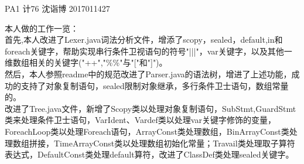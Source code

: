 \documentclass[UTF8]{ctexart}
\begin{document}
\begin{center}
PA1
计76 沈诣博 2017011427
\end{center}
本人做的工作一览：\\
首先,本人改进了Lexer.java词法分析文件，增添了scopy，sealed，default,in和foreach关键字，帮助实现串行条件卫视语句的符号"|||"，var关键字，以及其他一维数组相关的关键字("++","\%\%"与"["和"]")。\\
然后，本人参照readme中的规范改进了Parser.java的语法树，增进了上述功能，成功的支持了对象复制语句，sealed限制对象继承，多行条件卫士语句，数组常量的。\\
改进了Tree.java文件，新增了Scopy类以处理对象复制语句，SubStmt,GuardStmt类来处理条件卫士语句，VarIdent、Vardef类以处理var关键字修饰的变量，ForeachLoop类以处理Foreach语句，ArrayConst类处理数组，BinArrayConst类处理数组拼接，TimeArrayConst类以处理数组初始化常量；Travail类处理取子算符表达式，DefaultConst类处理default算符，改进了ClassDef类处理sealed关键字。
\end{document}
